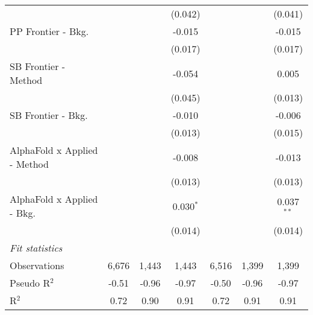 \begin{tabular}{lcccccc}
                                &                &         & (0.042)       &                &         & (0.041)\\   
   PP Frontier - Bkg.           &                &         & -0.015        &                &         & -0.015\\   
                                &                &         & (0.017)       &                &         & (0.017)\\   
   SB Frontier - Method         &                &         & -0.054        &                &         & 0.005\\   
                                &                &         & (0.045)       &                &         & (0.013)\\   
   SB Frontier - Bkg.           &                &         & -0.010        &                &         & -0.006\\   
                                &                &         & (0.013)       &                &         & (0.015)\\   
   AlphaFold x Applied - Method &                &         & -0.008        &                &         & -0.013\\   
                                &                &         & (0.013)       &                &         & (0.013)\\   
   AlphaFold x Applied - Bkg.   &                &         & 0.030$^{*}$   &                &         & 0.037$^{**}$\\   
                                &                &         & (0.014)       &                &         & (0.014)\\   
   \midrule
   \emph{Fit statistics}\\
   Observations                 & 6,676          & 1,443   & 1,443         & 6,516          & 1,399   & 1,399\\  
   Pseudo R$^2$                 & -0.51          & -0.96   & -0.97         & -0.50          & -0.96   & -0.97\\  
   R$^2$                        & 0.72           & 0.90    & 0.91          & 0.72           & 0.91    & 0.91\\  
   

\end{tabular}
